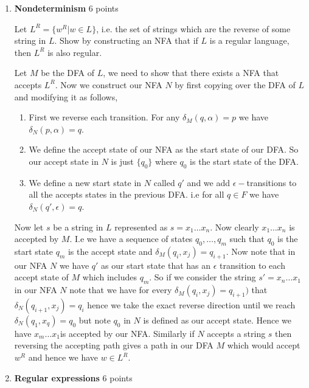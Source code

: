 \documentclass[11pt]{article}
\begin{document}
\begin{enumerate}
\begin{enumerate}
\begin{itemize}
    \end{itemize}
\end{enumerate}


\item \textbf{Nondeterminism} 6 points

Let $L^R = \{ w^R | w \in L\}$, i.e. the set of strings which are the reverse of some string in $L$. Show by constructing an NFA that if $L$ is a regular language, then $L^R$ is also regular.


\begin{answer}
  Let $M$ be the DFA of $L$, we need to show that there exists a NFA that accepts $L^{R}$. Now we construct our NFA $N$ by first copying over the DFA of $L$ and modifying it as follows, 
  \begin{enumerate}
    \item First we reverse each transition. For any $\delta_M(q, \alpha) = p$ we have $\delta_N(p, \alpha) = q$.
    \item We define the accept state of our NFA as the start state of our DFA. So our accept state in $N$ is just $\{q_{0}\}$ where $q_{0}$ is the start state of the DFA.
    \item We define a new start state in $N$ called $q'$ and we add $\epsilon-$transitions to all the accepts states in the previous DFA. i.e for all $q \in F$ we have $\delta_N(q', \epsilon) = q$.
  \end{enumerate}

  Now let $s$ be a string in $L$ represented as $s = x_{1} \dots x_n$. Now clearly $x_{1} \dots x_n$ is accepted by $M$. I.e we have a sequence of states $q_0, \dots, q_m$ such that $q_0$ is the start state $q_m$ is the accept state and $\delta_M(q_i, x_j) = q_{i + 1}$. Now note that in our NFA $N$ we have $q'$ as our start state that has an $\epsilon$ transition to each accept state of $M$  which includes $q_m$. So if we consider the string $s' = x_n \dots x_1$ in our NFA $N$ note that we have for every $\delta_M(q_i, x_j) = q_{i + 1})$ that $\delta_N(q_{i + 1}, x_j) = q_i$ hence we take the exact reverse direction until we reach $\delta_N(q_1, x_q) = q_0$ but note $q_0$ in $N$ is defined as our accept state. Hence we have $x_m \dots x_1$is accepted by our NFA. Similarly if $N$ accepts a string $s$ then reversing the accepting path gives a path in our DFA $M$ which would accept $w^{R}$ and hence we have $w \in L^{R}$.
\end{answer}

\item \textbf{Regular expressions} 6 points


\end{enumerate}
\end{document}
